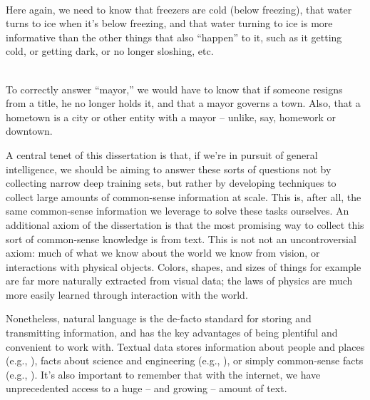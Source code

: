 \begin{displayquote}
   \\
  Here again, we need to know that freezers are cold (below freezing), that water turns to ice
    when it's below freezing, and that water turning to ice is more informative than the other things
    that also ``happen'' to it, such as it getting cold, or getting dark, or no longer sloshing, etc.
\end{displayquote}

\begin{displayquote}
   \\
  To correctly answer ``mayor,'' we would have to know that if someone resigns from a title, he no longer
    holds it, and that a mayor governs a town.
  Also, that a hometown is a city or other entity with a mayor -- unlike, say, homework or downtown.
\end{displayquote}

%
%

A central tenet of this dissertation is that, if we're in pursuit of general intelligence, we should be
  aiming to answer these sorts of questions not by collecting narrow deep training sets, but rather
  by developing techniques to collect large amounts of common-sense information at scale.
This is, after all, the same common-sense information we leverage to solve these tasks ourselves.
An additional axiom of the dissertation is that the most promising way to collect this sort of 
  common-sense knowledge is from text.
This is not not an uncontroversial axiom: much of what we know about the world we know from
  vision, or interactions with physical objects.
Colors, shapes, and sizes of things for example are far more naturally extracted from visual data;
  the laws of physics are much more easily learned through interaction with the world.

Nonetheless, natural language is the de-facto standard for storing and transmitting 
  information, and has the key advantages of being plentiful and convenient to work with.
Textual data stores information about people and places (e.g., ), facts about science and engineering (e.g., ), 
  or simply common-sense facts (e.g., ). 
It's also important to remember that with the internet, we have unprecedented access to a 
  huge -- and growing -- amount of text.

